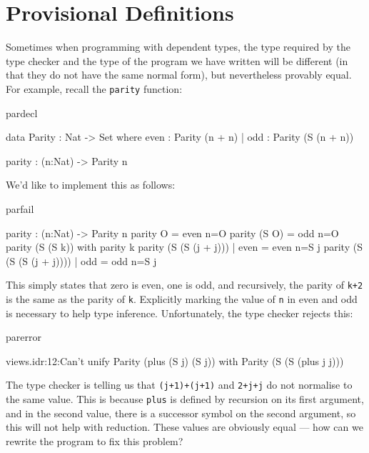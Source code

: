 \section{Provisional Definitions}

Sometimes when programming with dependent types, the type required by the type
checker and the type of the program we have written will be different (in that
they do not have the same normal form), but nevertheless provably equal. For
example, recall the \texttt{parity} function:

\begin{SaveVerbatim}{pardecl}

data Parity : Nat -> Set where
   even : Parity (n + n)
 | odd  : Parity (S (n + n))

parity : (n:Nat) -> Parity n

\end{SaveVerbatim}

\noindent
We'd like to implement this as follows:

\begin{SaveVerbatim}{parfail}

parity : (n:Nat) -> Parity n
parity O     = even {n=O}
parity (S O) = odd {n=O}
parity (S (S k)) with parity k {
  parity (S (S (j + j)))     | even = even {n=S j}
  parity (S (S (S (j + j)))) | odd  = odd {n=S j}
}

\end{SaveVerbatim}

\noindent
This simply states that zero is even, one is odd, and recursively, the parity
of \texttt{k+2} is the same as the parity of \texttt{k}. 
Explicitly marking the value of \texttt{n} in
even and odd is necessary to help type inference. Unfortunately, the type
checker rejects this:

\begin{SaveVerbatim}{parerror}

views.idr:12:Can't unify Parity (plus (S j) (S j)) with 
Parity (S (S (plus j j)))

\end{SaveVerbatim}

\noindent
The type checker
is telling us that \texttt{(j+1)+(j+1)} and \texttt{2+j+j}
do not normalise to the same value.
This is because \texttt{plus} is defined by recursion on its first argument, and in the
second value, there is a successor symbol on the second argument, so this will
not help with reduction. These values are obviously equal --- how can we rewrite
the program to fix this problem?

